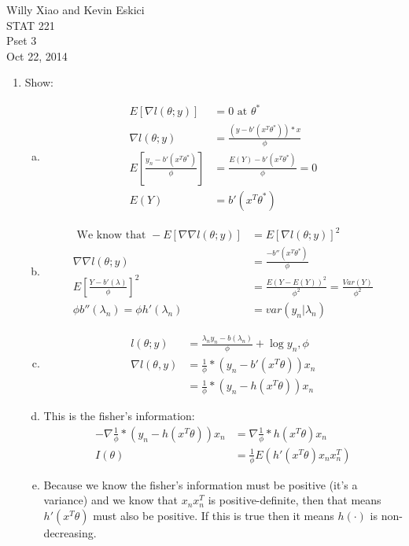 \documentclass[paper=a4, fontsize=11pt]{scrartcl}
\begin{document}
\noindent Willy Xiao and Kevin Eskici \\ STAT 221 \\Pset 3\\ Oct 22, 2014
\begin{enumerate}
  \item Show: \\
    \begin{enumerate}[(a)]    
      \item \begin{align*}
        E\left[ \nabla l(\theta; y) \right] &= 0 \text{ at }\theta^* \\
        \nabla l(\theta; y) &= \frac{(y - b'(x^T\theta^*))*x}{\phi} \\
        E\left[ \frac{y_n - b'(x^T\theta^*)}{\phi} \right] &= \frac{E(Y) - b'(x^T\theta^*)}{\phi} = 0 \\
        E(Y) &= b'(x^T\theta^*)
      \end{align*}
      \item \begin{align*}
        \text{ We know that } -E\left[ \nabla \nabla l(\theta; y) \right] &= E\left[ \nabla l(\theta; y) \right]^2 \\
        \nabla \nabla l(\theta; y) &= \frac{-b''(x^T\theta^*)}{\phi} \\
        E\left[ \frac{Y - b'(\lambda)}{\phi} \right]^2 &= \frac{E(Y - E(Y))^2}{\phi^2} = \frac{Var(Y)}{\phi^2} \\
        \phi b''(\lambda_n) = \phi h'(\lambda_n) &= var(y_n|\lambda_n)
      \end{align*}
      \item \begin{align*}
        l(\theta; y) &= \frac{\lambda_ny_n - b(\lambda_n)}{\phi} + \log{y_n, \phi} \\
        \nabla l(\theta, y) &= \frac{1}{\phi}*(y_n - b'(x^T\theta))x_n \\
          &= \frac{1}{\phi}*(y_n - h(x^T\theta))x_n
      \end{align*}
      \item This is the fisher's information:
        \begin{align*}
          - \nabla \frac{1}{\phi}*(y_n - h(x^T\theta))x_n &= \nabla \frac{1}{\phi}*h(x^T\theta)x_n \\
          I(\theta) &= \frac{1}{\phi} E(h'(x^T\theta)x_nx_n^T)
        \end{align*}
      \item Because we know the fisher's information must be positive (it's a variance) and we know that $x_nx_n^T$ is positive-definite, then that means $h'(x^T\theta)$ must also be positive. If this is true then it means $h(\cdot)$ is non-decreasing.

\end{enumerate}
\end{enumerate}
\end{document}
